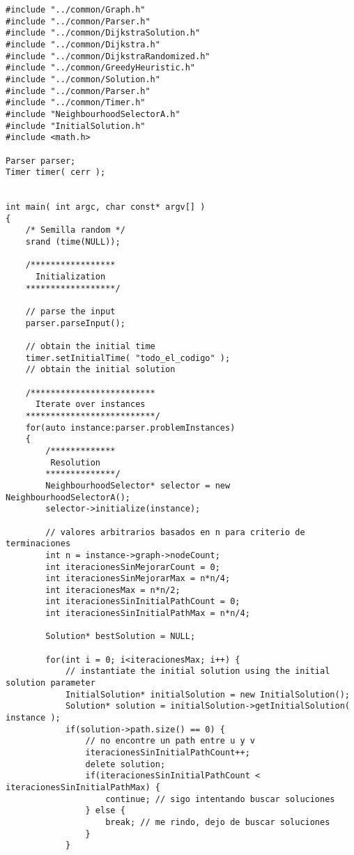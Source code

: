 \begin{lstlisting}[caption=grasp.cpp]
#include "../common/Graph.h"
#include "../common/Parser.h"
#include "../common/DijkstraSolution.h"
#include "../common/Dijkstra.h"
#include "../common/DijkstraRandomized.h"
#include "../common/GreedyHeuristic.h"
#include "../common/Solution.h"
#include "../common/Parser.h"
#include "../common/Timer.h"
#include "NeighbourhoodSelectorA.h"
#include "InitialSolution.h"
#include <math.h>

Parser parser;
Timer timer( cerr );


int main( int argc, char const* argv[] ) 
{
    /* Semilla random */
    srand (time(NULL));

    /*****************
      Initialization
    ******************/
            
    // parse the input
    parser.parseInput();  

    // obtain the initial time
    timer.setInitialTime( "todo_el_codigo" );
    // obtain the initial solution

    /*************************
      Iterate over instances
    **************************/
    for(auto instance:parser.problemInstances)
    {        
        /*************
         Resolution
        **************/           
        NeighbourhoodSelector* selector = new NeighbourhoodSelectorA();
        selector->initialize(instance);                        

        // valores arbitrarios basados en n para criterio de terminaciones
        int n = instance->graph->nodeCount;
        int iteracionesSinMejorarCount = 0;
        int iteracionesSinMejorarMax = n*n/4;
        int iteracionesMax = n*n/2;
        int iteracionesSinInitialPathCount = 0;
        int iteracionesSinInitialPathMax = n*n/4;
        
        Solution* bestSolution = NULL;            

        for(int i = 0; i<iteracionesMax; i++) {              
            // instantiate the initial solution using the initial solution parameter
            InitialSolution* initialSolution = new InitialSolution();              
            Solution* solution = initialSolution->getInitialSolution( instance );                     
            if(solution->path.size() == 0) {
                // no encontre un path entre u y v
                iteracionesSinInitialPathCount++;
                delete solution;            
                if(iteracionesSinInitialPathCount < iteracionesSinInitialPathMax) {
                    continue; // sigo intentando buscar soluciones
                } else {
                    break; // me rindo, dejo de buscar soluciones
                }            
            }                        


\end{lstlisting}
